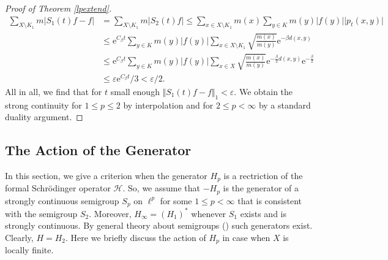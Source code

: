 \documentclass[10pt]{amsart}
\theoremstyle{definition}
\newtheorem*{remark}{Remark}
\begin{document}
\begin{proof}[Proof of Theorem \ref{lpextend}]
\begin{align*}
    \sum_{X\setminus K_1}m\vert S_1(t)f-f\vert &= \sum_{X\setminus K_1} m\vert S_2(t)f\vert\leq \sum_{x\in X\setminus K_1}m(x)\sum_{y\in K}m(y)\vert f(y)\vert\vert p_t(x,y)\vert\\
    &\leq \mathrm{e}^{C_\beta t}\sum_{y\in K}m(y)\vert f(y)\vert\sum_{x\in X\setminus K_1}\sqrt{\frac{m(x)}{m(y)}}\mathrm{e}^{-\beta d(x,y)}\\
    &\leq \mathrm{e}^{C_\beta t}\sum_{y\in K}m(y)\vert f(y)\vert\sum_{x\in X}\sqrt{\frac{m(x)}{m(y)}}\mathrm{e}^{-\frac{\beta}{2} d(x,y)}\mathrm{e}^{-\frac{\beta}{2}}\\
    &\leq \varepsilon\mathrm{e}^{C_\beta t}\slash 3< \varepsilon\slash 2.
\end{align*}
All in all, we find that for $t$ small enough $\Vert S_1(t)f-f\Vert_1<\varepsilon.$ We obtain the strong continuity for $1\leq p\leq 2$ by interpolation and for $2\leq p<\infty$ by a standard duality argument.\end{proof}



\subsection{The Action of the Generator} In this section, we give a criterion when the generator $H_p$ is a rectriction of the formal Schrödinger operator $\mathcal{H}$.
So, we assume that $ -H_p$ is the generator of a strongly continuous semigroup $S_p$ on $\ell^p$ for some $1\leq p<\infty$ that is consistent with the semigroup $S_2$. Moreover, $H_\infty=(H_1)^*$   whenever $S_1$ exists and is strongly continuous. By general theory about semigroups (\cite{EngelNagelShort,KLW}) such generators exist. Clearly, $ H =  H_2.$ Here we briefly discuss the action of $ H_p$ in case when $ X$ is locally finite. 
\end{document}
